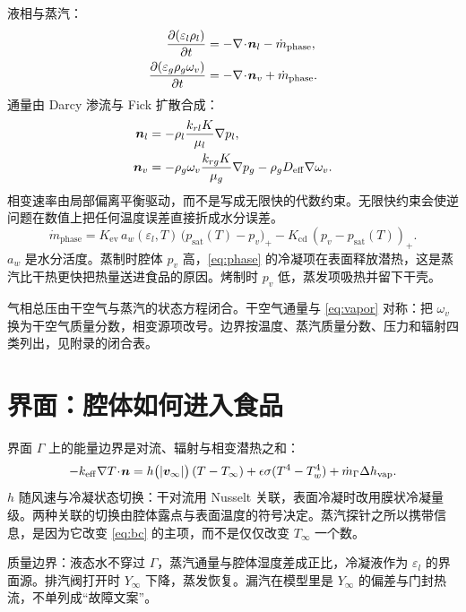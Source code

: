 液相与蒸汽：
\begin{align}
\label{eq:liquid}
\frac{\partial(\varepsilon_l\rho_l)}{\partial t}
&=-\nabla\!\cdot\!\bm{n}_l-\dot m_{\mathrm{phase}},\\
\label{eq:vapor}
\frac{\partial(\varepsilon_g\rho_g\omega_v)}{\partial t}
&=-\nabla\!\cdot\!\bm{n}_v+\dot m_{\mathrm{phase}}.
\end{align}
通量由 Darcy 渗流与 Fick 扩散合成：
\begin{align}
\bm{n}_l&=-\rho_l\frac{k_{rl}K}{\mu_l}\nabla p_l,\\
\bm{n}_v&=-\rho_g\omega_v\frac{k_{rg}K}{\mu_g}\nabla p_g
-\rho_g D_{\mathrm{eff}}\nabla\omega_v.
\end{align}
相变速率由局部偏离平衡驱动，而不是写成无限快的代数约束。无限快约束会使逆问题在数值上把任何温度误差直接折成水分误差。
\begin{equation}
\label{eq:phase}
\dot m_{\mathrm{phase}}
=K_{\mathrm{ev}}\,a_w(\varepsilon_l,T)\,
\big(p_{\mathrm{sat}}(T)-p_v\big)_+
-K_{\mathrm{cd}}\,(p_v-p_{\mathrm{sat}}(T))_+.
\end{equation}
$a_w$ 是水分活度。蒸制时腔体 $p_v$ 高，\eqref{eq:phase} 的冷凝项在表面释放潜热，这是蒸汽比干热更快把热量送进食品的原因。烤制时 $p_v$ 低，蒸发项吸热并留下干壳。

气相总压由干空气与蒸汽的状态方程闭合。干空气通量与 \eqref{eq:vapor} 对称：把 $\omega_v$ 换为干空气质量分数，相变源项改号。边界按温度、蒸汽质量分数、压力和辐射四类列出，见附录的闭合表。

\section{界面：腔体如何进入食品}

界面 $\Gamma$ 上的能量边界是对流、辐射与相变潜热之和：
\begin{equation}
\label{eq:bc}
-k_{\mathrm{eff}}\nabla T\!\cdot\!\bm{n}
=h\big(|\bm{v}_\infty|\big)\,(T-T_\infty)
+\epsilon\sigma(T^4-T_w^4)
+\dot m_{\Gamma}\Delta h_{\mathrm{vap}}.
\end{equation}
$h$ 随风速与冷凝状态切换：干对流用 Nusselt 关联，表面冷凝时改用膜状冷凝量级。两种关联的切换由腔体露点与表面温度的符号决定。蒸汽探针之所以携带信息，是因为它改变 \eqref{eq:bc} 的主项，而不是仅仅改变 $T_\infty$ 一个数。

质量边界：液态水不穿过 $\Gamma$，蒸汽通量与腔体湿度差成正比，冷凝液作为 $\varepsilon_l$ 的界面源。排汽阀打开时 $Y_\infty$ 下降，蒸发恢复。漏汽在模型里是 $Y_\infty$ 的偏差与门封热流，不单列成“故障文案”。

